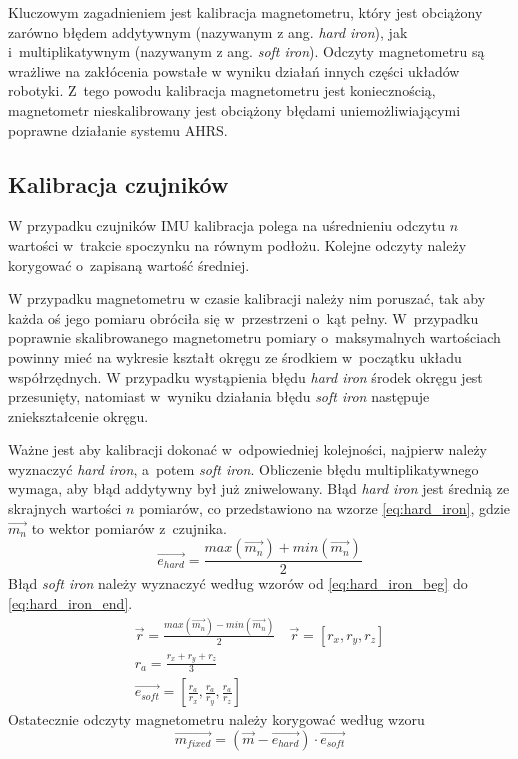 Kluczowym zagadnieniem jest kalibracja magnetometru, który jest obciążony
zarówno błędem addytywnym (nazywanym z ang. \textit{hard iron}), jak
i~multiplikatywnym (nazywanym z ang. \textit{soft iron}).
Odczyty magnetometru są wrażliwe na zakłócenia powstałe w wyniku działań innych
części układów robotyki.
Z~tego powodu kalibracja magnetometru jest koniecznością, magnetometr
nieskalibrowany jest obciążony błędami uniemożliwiającymi poprawne działanie
systemu AHRS.

\subsection{Kalibracja czujników}
W przypadku czujników IMU kalibracja polega na uśrednieniu odczytu $ n $
wartości w~trakcie spoczynku na równym podłożu.
Kolejne odczyty należy korygować o~zapisaną wartość średniej.

W przypadku magnetometru w czasie kalibracji należy nim poruszać, tak aby
każda oś jego pomiaru obróciła się w~przestrzeni o~kąt pełny.
W~przypadku poprawnie skalibrowanego magnetometru pomiary o~maksymalnych
wartościach powinny mieć na wykresie kształt okręgu ze środkiem w~początku
układu współrzędnych.
W przypadku wystąpienia błędu \textit{hard iron} środek okręgu jest
przesunięty, natomiast w~wyniku działania błędu \textit{soft iron} następuje
zniekształcenie okręgu.

Ważne jest aby kalibracji dokonać w~odpowiedniej kolejności, najpierw należy
wyznaczyć \textit{hard iron}, a~potem \textit{soft iron}.
Obliczenie błędu multiplikatywnego wymaga, aby błąd addytywny był już
zniwelowany.
Błąd \textit{hard iron} jest średnią ze skrajnych wartości $ n $ pomiarów, co
przedstawiono na wzorze \ref{eq:hard_iron}, gdzie $ \vec{m_n} $ to wektor
pomiarów z~czujnika.
\begin{equation}
	\vec{e_{hard}} = 
		\frac{max\left(\vec{m_n}\right) + min\left(\vec{m_n}\right)}{2}
\label{eq:hard_iron}
\end{equation}
Błąd \textit{soft iron} należy wyznaczyć według wzorów od
\ref{eq:hard_iron_beg} do \ref{eq:hard_iron_end}.
\begin{gather}
	\vec{r} =
		\frac{max\left(\vec{m_n}\right) - min\left(\vec{m_n}\right)}{2}
	\quad
	\vec{r} = \left[r_x, r_y, r_z\right] \\
\label{eq:hard_iron_beg}
	r_a = \frac{r_x + r_y + r_z}{3} \\
	\vec{e_{soft}} =
		\left[ \frac{r_a}{r_x}, \frac{r_a}{r_y}, \frac{r_a}{r_z}\right]
\label{eq:hard_iron_end}
\end{gather}
Ostatecznie odczyty magnetometru należy korygować według wzoru
\begin{equation}
	\vec{m_{fixed}} = \left(\vec{m} - \vec{e_{hard}}\right) \cdot \vec{e_{soft}}
\end{equation}


